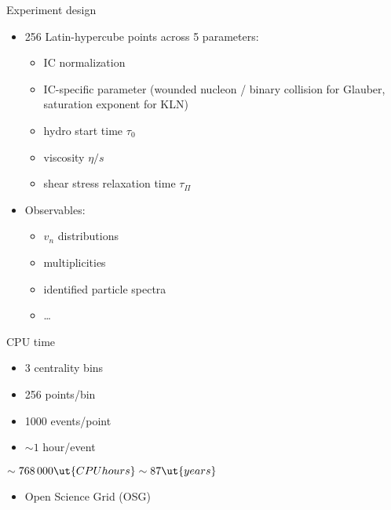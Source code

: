 \documentclass{beamer}
\begin{document}
\begin{frame}{Experiment design}
  \begin{itemize}
    \item 256 Latin-hypercube points across 5 parameters:
      \begin{itemize}
        \item IC normalization
        \item IC-specific parameter (wounded nucleon / binary collision for Glauber, saturation exponent for KLN)
        \item hydro start time $\tau_0$
        \item viscosity $\eta/s$
        \item shear stress relaxation time $\tau_\Pi$
      \end{itemize}
    \item Observables:
      \begin{itemize}
        \item $v_n$ distributions
        \item multiplicities
        \item identified particle spectra
        \item \ldots
      \end{itemize}
  \end{itemize}
\end{frame}





\begin{frame}{CPU time}
  \begin{itemize}
    \item 3 centrality bins
    \item 256 points/bin
    \item 1000 events/point
    \item $\sim 1$ hour/event
  \end{itemize}
  \mds
  \centering $\sim 768\,000 \ut{CPU hours} \sim 87 \ut{years}$
  \mds
  \begin{itemize}
    \item Open Science Grid (OSG)
  \end{itemize}
\end{frame}
\end{document}
